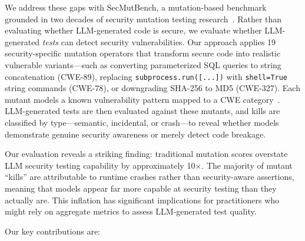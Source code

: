 \documentclass[sigconf,review,anonymous]{acmart}
\begin{document}
We address these gaps with SecMutBench, a mutation-based benchmark grounded in two decades of security mutation testing research~\cite{du2000testing,shahriar2008music,mouelhi2007mutation}. Rather than evaluating whether LLM-generated code is secure, we evaluate whether LLM-generated \emph{tests} can detect security vulnerabilities. Our approach applies 19 security-specific mutation operators that transform secure code into realistic vulnerable variants---such as converting parameterized SQL queries to string concatenation (CWE-89), replacing \texttt{subprocess.run([...])} with \texttt{shell=True} string commands (CWE-78), or downgrading SHA-256 to MD5 (CWE-327). Each mutant models a known vulnerability pattern mapped to a CWE category~\cite{mitre2024cwe}. LLM-generated tests are then evaluated against these mutants, and kills are classified by type---semantic, incidental, or crash---to reveal whether models demonstrate genuine security awareness or merely detect code breakage.

Our evaluation reveals a striking finding: traditional mutation scores overstate LLM security testing capability by approximately 10$\times$. The majority of mutant ``kills'' are attributable to runtime crashes rather than security-aware assertions, meaning that models appear far more capable at security testing than they actually are. This inflation has significant implications for practitioners who might rely on aggregate metrics to assess LLM-generated test quality.

Our key contributions are:
\end{document}
